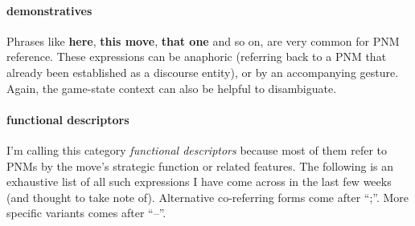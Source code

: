 \documentclass{scrartcl}
\begin{document}
\paragraph{demonstratives}

Phrases like \textbf{here}, \textbf{this move}, \textbf{that one}
and so on, are very common for PNM reference. 
These expressions can be anaphoric 
(referring back to a PNM that already been established as a discourse entity),
or by an accompanying gesture. 
Again, the game-state context can also be helpful to disambiguate.

\paragraph{functional descriptors}

I'm calling this category \emph{functional descriptors} because most of 
them refer to PNMs by the move's strategic function or related features.
The following is an exhaustive list of all such expressions I have come
across in the last few weeks (and thought to take note of).
Alternative co-referring forms come after ``;''. 
More specific variants comes after ``--''.
\end{document}
